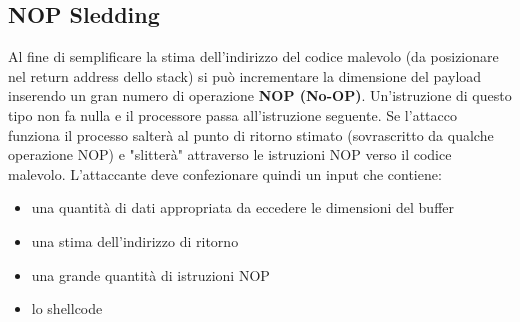 \subsection{NOP Sledding}
Al fine di semplificare la stima dell'indirizzo del codice malevolo (da posizionare nel return address dello stack) si può incrementare la dimensione del payload inserendo un gran numero di operazione \textbf{NOP (No-OP)}. Un'istruzione di questo tipo non fa nulla e il processore passa all'istruzione seguente. Se l'attacco funziona il processo salterà al punto di ritorno stimato (sovrascritto da qualche operazione NOP) e "slitterà" attraverso le istruzioni NOP verso il codice malevolo. L'attaccante deve confezionare quindi un input che contiene:
\begin{itemize}
  \item una quantità di dati appropriata da eccedere le dimensioni del buffer
  \item una stima dell'indirizzo di ritorno
  \item una grande quantità di istruzioni NOP
  \item lo shellcode
\end{itemize}
